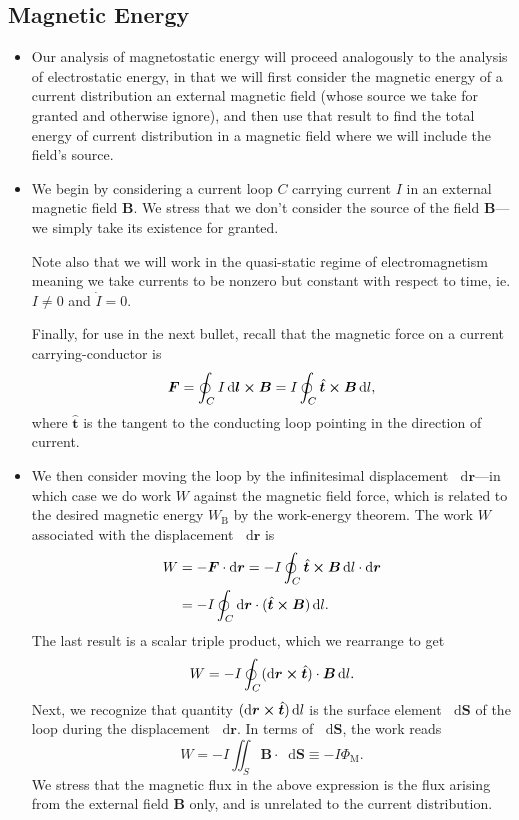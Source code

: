 \documentclass[11pt, a4paper]{article}
\newcommand{\diff}{\mathop{}\!\mathrm{d}} %
\renewcommand{\vec}[1]{\bm{#1}} %
\newcommand{\uvec}[1]{\hat{\vec{#1}}} %
\renewcommand{\r}{\vec{r}}
\newcommand{\B}{\vec{B}} %
\begin{document}
\subsection{Magnetic Energy}
\begin{itemize}
    \item Our analysis of magnetostatic energy will proceed analogously to the analysis of electrostatic energy, in that we will first consider the magnetic energy of a current distribution an external magnetic field (whose source we take for granted and otherwise ignore), and then use that result to find the total energy of current distribution in a magnetic field where we will include the field's source.
	
	\item We begin by considering a current loop $ C $ carrying current $ I $ in an external magnetic field $ \B $. We stress that we don't consider the source of the field $ \B $---we simply take its existence for granted. 
	
    Note also that we will work in the quasi-static regime of electromagnetism meaning we take currents to be nonzero but constant with respect to time, ie. $ I \neq 0 $ and $ \dot{I} = 0 $.

    Finally, for use in the next bullet, recall that the magnetic force on a current carrying-conductor is
	\begin{equation*}
		\vec{F} = \oint_{C} I \diff \vec{l} \cross \B = I \oint_{C} \uvec{t} \cross \B \diff l,
	\end{equation*}
	where $ \uvec{t} $ is the tangent to the conducting loop pointing in the direction of current.
	
	\item We then consider moving the loop by the infinitesimal displacement $ \diff \r $---in which case we do work $ W $ against the magnetic field force, which is related to the desired magnetic energy $ W_{\mathrm{B}} $ by the work-energy theorem. The work $ W $ associated with the displacement $ \diff \r $ is
	\begin{align*}
		W &= - \vec{F} \cdot \diff \r =  -I \oint_{C} \uvec{t} \cross \B \diff l \cdot \diff \r\\
		& = - I \oint_{C}\diff \r \cdot (\uvec{t} \cross \B) \diff l.
	\end{align*}
    The last result is a scalar triple product, which we rearrange to get
	\begin{equation*}
		W = - I \oint_{C} (\diff \r \cross \uvec{t})\cdot \B \diff l.
	\end{equation*}
	Next, we recognize that quantity $ (\diff \r \cross \uvec{t}) \diff l $ is the surface element $ \diff \vec{S} $  of the loop during the displacement $ \diff \r $. In terms of $ \diff \vec{S} $, the work reads
	\begin{equation*}
		W = - I \iint_{S} \B \cdot \diff \vec{S} \equiv - I \Phi_{\mathrm{M}}.
	\end{equation*}
    We stress that the magnetic flux in the above expression is the flux arising from the external field $ \B $ only, and is unrelated to the current distribution.
	

\end{itemize}
\end{document}
